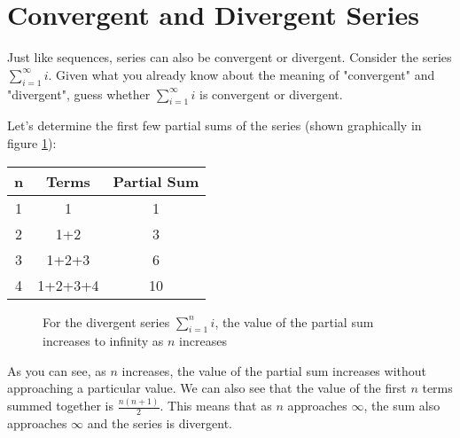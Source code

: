 \section{Convergent and Divergent Series}
Just like sequences, series can also be convergent or divergent. 
Consider the series $\sum_{i=1}^\infty i$. Given what you already 
know about the meaning of "convergent" and "divergent", guess whether 
$\sum_{i=1}^\infty i$ is convergent or divergent. 

Let's determine the first few partial sums of the series (shown 
graphically in figure \ref{fig:divsum}):
\begin{center}
\begin{tabular}{|c|c|c|}\hline
n & Terms & Partial Sum\\
\hline
1 & 1 & 1\\
\hline
2 & 1+2 & 3\\
\hline
3 & 1+2+3 & 6\\
\hline
4 & 1+2+3+4 & 10\\
\hline
\end{tabular}
\end{center}

\begin{figure}[htbp]
\centering
    \caption{For the divergent series $\sum_{i=1}^n i$, the value of the 
    partial sum increases to infinity as $n$ increases}
    \label{fig:divsum}
\end{figure}

As you can see, as $n$ increases, the value of the partial sum 
increases without approaching a particular value. We can also see 
that the value of the first $n$ terms summed together is 
$\frac{n(n+1)}{2}$. This means that as $n$ approaches $\infty$, the 
sum also approaches $\infty$ and the series is divergent. 

